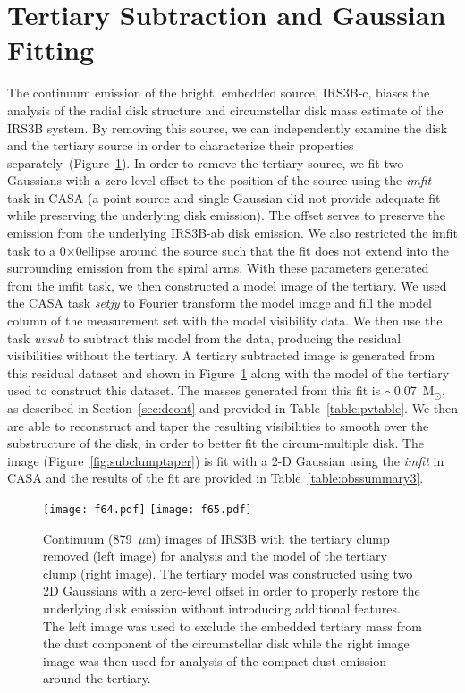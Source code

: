 \documentclass[twocolumn, 12pt]{aastex63}
\renewcommand{\micron}{$\mu$m}
\newcommand{\ab}{$\sim$}
\newcommand{\solm}{M$_{\odot}$}
\begin{document}
\section{Tertiary Subtraction and Gaussian Fitting}\label{sec:tertsub}
The continuum emission of the bright, embedded source, IRS3B-c, biases the analysis of the radial disk structure and circumstellar disk mass estimate of the IRS3B system. By removing this source, we can independently examine the disk and the tertiary source in order to characterize their properties separately~(Figure~\ref{fig:subclump}). In order to remove the tertiary source, we fit two Gaussians with a zero-level offset to the position of the source using the \textit{imfit} task in CASA (a point source and single Gaussian did not provide adequate fit while preserving the underlying disk emission). The offset serves to preserve the emission from the underlying IRS3B-ab disk emission. We also restricted the imfit task to a 0$\times$0\space ellipse around the source such that the fit does not extend into the surrounding emission from the spiral arms. With these parameters generated from the imfit task, we then constructed a model image of the tertiary. We used the CASA task \textit{setjy} to Fourier transform the model image and fill the model column of the measurement set with the model visibility data. We then use the task \textit{uvsub} to subtract this model from the data, producing the residual visibilities without the tertiary. A tertiary subtracted image is generated from this residual dataset and shown in Figure~\ref{fig:subclump} along with the model of the tertiary used to construct this dataset. The masses generated from this fit is \ab0.07~\solm, as described in Section~\ref{sec:dcont} and provided in Table~\ref{table:pvtable}. We then are able to reconstruct and taper the resulting visibilities to smooth over the substructure of the disk, in order to better fit the circum-multiple disk. The image (Figure~\ref{fig:subclumptaper}) is fit with a 2-D Gaussian using the \textit{imfit} in CASA and the results of the fit are provided in Table~\ref{table:obssummary3}.

\begin{figure}[H]
  \begin{center}
   \texttt{[image: f64.pdf]}
   \texttt{[image: f65.pdf]}
   \end{center}
   \caption{Continuum (879~\micron) images of IRS3B with the tertiary clump removed (left image) for analysis and the model of the tertiary clump (right image). The tertiary model was constructed using two 2D Gaussians with a zero-level offset in order to properly restore the underlying disk emission without introducing additional features. The left image was used to exclude the embedded tertiary mass from the dust component of the circumstellar disk while the right image image was then used for analysis of the compact dust emission around the tertiary.} \label{fig:subclump}
\end{figure}
\end{document}

